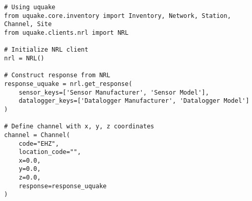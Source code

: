 \begin{verbatim}
# Using uquake
from uquake.core.inventory import Inventory, Network, Station, Channel, Site
from uquake.clients.nrl import NRL

# Initialize NRL client
nrl = NRL()

# Construct response from NRL
response_uquake = nrl.get_response(
    sensor_keys=['Sensor Manufacturer', 'Sensor Model'],
    datalogger_keys=['Datalogger Manufacturer', 'Datalogger Model']
)

# Define channel with x, y, z coordinates
channel = Channel(
    code="EHZ",
    location_code="",
    x=0.0,
    y=0.0,
    z=0.0,
    response=response_uquake
)
\end{verbatim}

